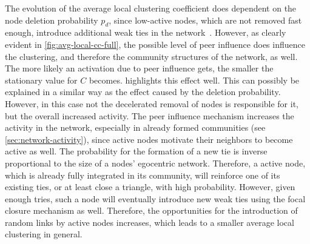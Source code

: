 The evolution of the average local clustering coefficient does dependent on the node deletion probability \( p_{d} \), since low-active nodes, which are not removed fast enough, introduce additional weak ties in the network~\cite{Laurent2015}.
However, as clearly evident in \cref{fig:avg-local-cc-full}, the possible level of peer influence does influence the clustering, and therefore the community structures of the network, as well.
The more likely an activation due to peer influence gets, the smaller the stationary value for \( C \) becomes.
 highlights this effect well.
This can possibly be explained in a similar way as the effect caused by the deletion probability.
However, in this case not the decelerated removal of nodes is responsible for it, but the overall increased activity.
The peer influence mechanism increases the activity in the network, especially in already formed communities (see \cref{sec:network-activity}), since active nodes motivate their neighbors to become active as well.
The probability for the formation of a new tie is inverse proportional to the size of a nodes' egocentric network.
Therefore, a active node, which is already fully integrated in its community, will reinforce one of its existing ties, or at least close a triangle, with high probability.
However, given enough tries, such a node will eventually introduce new weak ties using the focal closure mechanism as well.
Therefore, the opportunities for the introduction of random links by active nodes increases, which leads to a smaller average local clustering in general.

